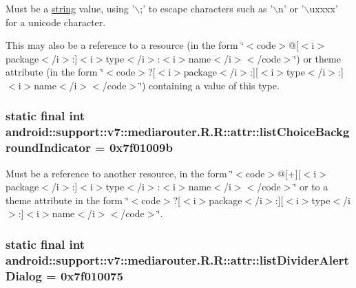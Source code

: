 Must be a \hyperlink{classandroid_1_1support_1_1v7_1_1mediarouter_1_1_r_1_1string}{string} value, using '$\backslash$;' to escape characters such as '$\backslash$n' or '$\backslash$uxxxx' for a unicode character. 

This may also be a reference to a resource (in the form \char`\"{}$<$code$>$@\mbox{[}$<$i$>$package$<$/i$>$:\mbox{]}$<$i$>$type$<$/i$>$:$<$i$>$name$<$/i$>$$<$/code$>$\char`\"{}) or theme attribute (in the form \char`\"{}$<$code$>$?\mbox{[}$<$i$>$package$<$/i$>$:\mbox{]}\mbox{[}$<$i$>$type$<$/i$>$:\mbox{]}$<$i$>$name$<$/i$>$$<$/code$>$\char`\"{}) containing a value of this type. \hypertarget{classandroid_1_1support_1_1v7_1_1mediarouter_1_1_r_1_1attr_c5e61e9f4da176fbf01baa9d6f10eefe}{
\subsubsection[{listChoiceBackgroundIndicator}]{\setlength{\rightskip}{0pt plus 5cm}static final int android::support::v7::mediarouter.R.R::attr::listChoiceBackgroundIndicator = 0x7f01009b}}
\label{classandroid_1_1support_1_1v7_1_1mediarouter_1_1_r_1_1attr_c5e61e9f4da176fbf01baa9d6f10eefe}


Must be a reference to another resource, in the form \char`\"{}$<$code$>$@\mbox{[}+\mbox{]}\mbox{[}$<$i$>$package$<$/i$>$:\mbox{]}$<$i$>$type$<$/i$>$:$<$i$>$name$<$/i$>$$<$/code$>$\char`\"{} or to a theme attribute in the form \char`\"{}$<$code$>$?\mbox{[}$<$i$>$package$<$/i$>$:\mbox{]}\mbox{[}$<$i$>$type$<$/i$>$:\mbox{]}$<$i$>$name$<$/i$>$$<$/code$>$\char`\"{}. \hypertarget{classandroid_1_1support_1_1v7_1_1mediarouter_1_1_r_1_1attr_ccae51845ff93d868c1dad649026a3a9}{
\subsubsection[{listDividerAlertDialog}]{\setlength{\rightskip}{0pt plus 5cm}static final int android::support::v7::mediarouter.R.R::attr::listDividerAlertDialog = 0x7f010075}}
\label{classandroid_1_1support_1_1v7_1_1mediarouter_1_1_r_1_1attr_ccae51845ff93d868c1dad649026a3a9}


